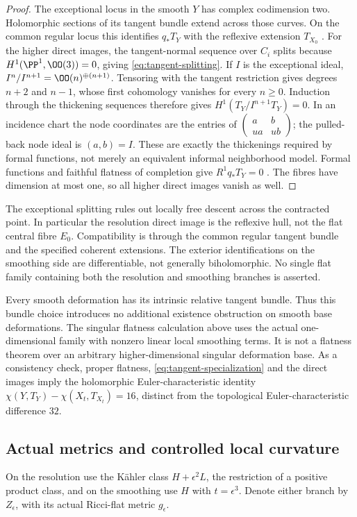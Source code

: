 \begin{proof}
The exceptional locus in the smooth $Y$ has complex codimension two. Holomorphic sections of its tangent bundle extend
across those curves. On the common regular locus this identifies
$q_*T_Y$ with the reflexive extension $T_{X_0}$
\cite[Tags 0EBJ and 0AY6]{stacks}.
For the higher direct images, the tangent-normal sequence over $C_i$
splits because $H^1(\PP^1,\OO(3))=0$, giving
\eqref{eq:tangent-splitting}. If $I$ is the exceptional ideal,
$I^n/I^{n+1}=\OO(n)^{\oplus(n+1)}$. Tensoring with the tangent
restriction gives degrees $n+2$ and $n-1$, whose first cohomology
vanishes for every $n\ge0$. Induction through the thickening sequences
therefore gives $H^1(T_Y/I^{n+1}T_Y)=0$.
In an incidence chart the node coordinates are the entries of
$\left(\begin{smallmatrix}a&b\\ua&ub\end{smallmatrix}\right)$;
the pulled-back node ideal is $(a,b)=I$. These are exactly the
thickenings required by formal functions, not merely an equivalent
informal neighborhood model. Formal functions and faithful flatness
of completion give $R^1q_*T_Y=0$ \cite[Tag 02OC]{stacks}.
The fibres have dimension at most one, so all higher direct images
vanish as well.
\end{proof}

The exceptional splitting rules out locally free descent across the
contracted point. In particular the resolution direct image is the
reflexive hull, not the flat central fibre $E_0$. Compatibility is
through the common regular tangent bundle and the specified coherent
extensions. The exterior identifications on the smoothing side are
differentiable, not generally biholomorphic. No single flat family
containing both the resolution and smoothing branches is asserted.

Every smooth deformation has its intrinsic relative tangent bundle.
Thus this bundle choice introduces no additional existence obstruction
on smooth base deformations. The singular flatness calculation above
uses the actual one-dimensional family with nonzero linear local
smoothing terms. It is not a flatness theorem over an arbitrary
higher-dimensional singular deformation base. As a consistency check,
proper flatness, \eqref{eq:tangent-specialization} and the direct images
imply the holomorphic Euler-characteristic identity
$\chi(Y,T_Y)-\chi(X_t,T_{X_t})=16$, distinct from the topological
Euler-characteristic difference $32$.

\subsection{Actual metrics and controlled local curvature}
On the resolution use the K\"ahler class $H+\epsilon^2L$, the restriction
of a positive product class, and on the smoothing use $H$ with
$t=\epsilon^3$. Denote either branch by $Z_\epsilon$, with its actual
Ricci-flat metric $g_\epsilon$.

